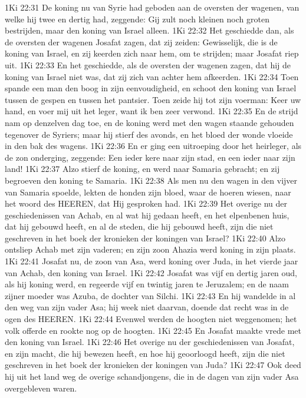 1Ki 22:31  De koning nu van Syrie had geboden aan de oversten der wagenen, van welke hij twee en dertig had, zeggende: Gij zult noch kleinen noch groten bestrijden, maar den koning van Israel alleen.
1Ki 22:32  Het geschiedde dan, als de oversten der wagenen Josafat zagen, dat zij zeiden: Gewisselijk, die is de koning van Israel, en zij keerden zich naar hem, om te strijden; maar Josafat riep uit.
1Ki 22:33  En het geschiedde, als de oversten der wagenen zagen, dat hij de koning van Israel niet was, dat zij zich van achter hem afkeerden.
1Ki 22:34  Toen spande een man den boog in zijn eenvoudigheid, en schoot den koning van Israel tussen de gespen en tussen het pantsier. Toen zeide hij tot zijn voerman: Keer uw hand, en voer mij uit het leger, want ik ben zeer verwond.
1Ki 22:35  En de strijd nam op denzelven dag toe, en de koning werd met den wagen staande gehouden tegenover de Syriers; maar hij stierf des avonds, en het bloed der wonde vloeide in den bak des wagens.
1Ki 22:36  En er ging een uitroeping door het heirleger, als de zon onderging, zeggende: Een ieder kere naar zijn stad, en een ieder naar zijn land!
1Ki 22:37  Alzo stierf de koning, en werd naar Samaria gebracht; en zij begroeven den koning te Samaria.
1Ki 22:38  Als men nu den wagen in den vijver van Samaria spoelde, lekten de honden zijn bloed, waar de hoeren wiesen, naar het woord des HEEREN, dat Hij gesproken had.
1Ki 22:39  Het overige nu der geschiedenissen van Achab, en al wat hij gedaan heeft, en het elpenbenen huis, dat hij gebouwd heeft, en al de steden, die hij gebouwd heeft, zijn die niet geschreven in het boek der kronieken der koningen van Israel?
1Ki 22:40  Alzo ontsliep Achab met zijn vaderen; en zijn zoon Ahazia werd koning in zijn plaats.
1Ki 22:41  Josafat nu, de zoon van Asa, werd koning over Juda, in het vierde jaar van Achab, den koning van Israel.
1Ki 22:42  Josafat was vijf en dertig jaren oud, als hij koning werd, en regeerde vijf en twintig jaren te Jeruzalem; en de naam zijner moeder was Azuba, de dochter van Silchi.
1Ki 22:43  En hij wandelde in al den weg van zijn vader Asa; hij week niet daarvan, doende dat recht was in de ogen des HEEREN.
1Ki 22:44  Evenwel werden de hoogten niet weggenomen; het volk offerde en rookte nog op de hoogten.
1Ki 22:45  En Josafat maakte vrede met den koning van Israel.
1Ki 22:46  Het overige nu der geschiedenissen van Josafat, en zijn macht, die hij bewezen heeft, en hoe hij geoorloogd heeft, zijn die niet geschreven in het boek der kronieken der koningen van Juda?
1Ki 22:47  Ook deed hij uit het land weg de overige schandjongens, die in de dagen van zijn vader Asa overgebleven waren.
